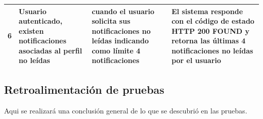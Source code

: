 \begin{center}
\begin{longtable}{|p{0.7cm}|p{4cm}|p{4cm}|p{5cm}| }
6& Usuario autenticado, existen notificaciones asociadas al perfil no leídas & cuando el usuario solicita sus notificaciones no leídas indicando como límite 4 notificaciones & El sistema responde con el código de estado HTTP 200 FOUND y retorna las últimas 4 notificaciones no leídas por el usuario\\ \hline


  \end{longtable}
\end{center}





\subsection{Retroalimentación de pruebas}
Aqui se realizará una conclusión general de lo que se descubrió en las pruebas.
